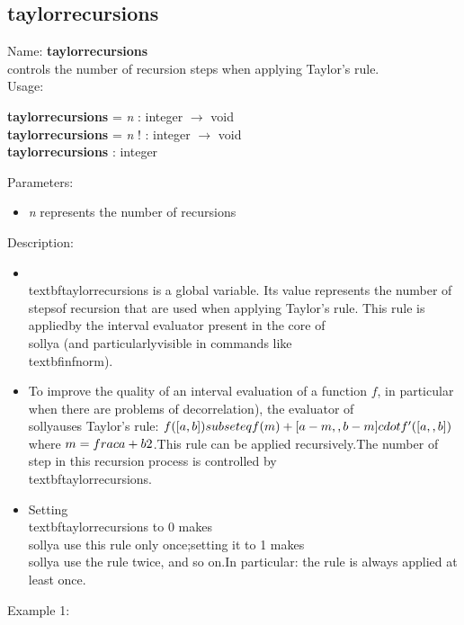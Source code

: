\subsection{taylorrecursions}
\label{labtaylorrecursions}
\noindent Name: \textbf{taylorrecursions}\\
controls the number of recursion steps when applying Taylor's rule.\\
\noindent Usage: 
\begin{center}
\textbf{taylorrecursions} = \emph{n} : \textsf{integer} $\rightarrow$ \textsf{void}\\
\textbf{taylorrecursions} = \emph{n} ! : \textsf{integer} $\rightarrow$ \textsf{void}\\
\textbf{taylorrecursions} : \textsf{integer}\\
\end{center}
Parameters: 
\begin{itemize}
\item \emph{n} represents the number of recursions
\end{itemize}
\noindent Description: \begin{itemize}

\item \\textbf{taylorrecursions} is a global variable. Its value represents the number of steps\n   of recursion that are used when applying Taylor's rule. This rule is applied\n   by the interval evaluator present in the core of \\sollya (and particularly\n   visible in commands like \\textbf{infnorm}).\n
\item To improve the quality of an interval evaluation of a function $f$, in \n   particular when there are problems of decorrelation), the evaluator of \\sollya\n   uses Taylor's rule:  $f([a,b]) \\subseteq f(m) + [a-m,\\,b-m] \\cdot f'([a,\\,b])$ where $m=\\frac{a+b}{2}$.\n   This rule can be applied recursively.\n   The number of step in this recursion process is controlled by \\textbf{taylorrecursions}.\n
\item Setting \\textbf{taylorrecursions} to 0 makes \\sollya use this rule only once;\n   setting it to 1 makes \\sollya use the rule twice, and so on.\n   In particular: the rule is always applied at least once.\n\end{itemize}
\noindent Example 1: 
\begin{center}\begin{minipage}{15cm}\begin{Verbatim}[frame=single]
\end{Verbatim}
\end{minipage}\end{center}
